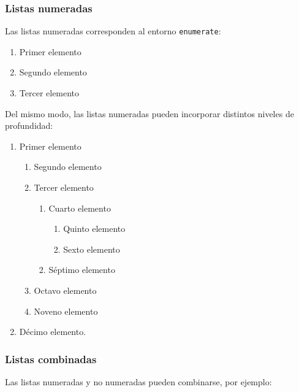 \documentclass[a4paper, 11pt, spanish, twoside]{article}
\begin{document}
\subsubsection{Listas numeradas}

Las listas numeradas corresponden al entorno \texttt{enumerate}:

\begin{enumerate}
    \item Primer elemento
    \item Segundo elemento
    \item Tercer elemento
\end{enumerate}

Del mismo modo, las listas numeradas pueden incorporar distintos niveles de profundidad:

\begin{enumerate}
    \item Primer elemento
    \begin{enumerate}
        \item Segundo elemento
        \item Tercer elemento
        \begin{enumerate}
            \item Cuarto elemento
            \begin{enumerate}
                \item Quinto elemento
                \item Sexto elemento
            \end{enumerate}
            \item Séptimo elemento
        \end{enumerate}
        \item Octavo elemento
        \item Noveno elemento
    \end{enumerate}
    \item Décimo elemento.
\end{enumerate}


\subsubsection{Listas combinadas}

Las listas numeradas y no numeradas pueden combinarse, por ejemplo:
\end{document}
